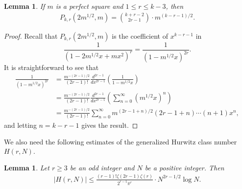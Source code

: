 \documentclass[11pt,letterpaper,reqno]{amsart}
\numberwithin{figure}{section}
\numberwithin{table}{section}
\theoremstyle{definition}
\theoremstyle{plain}
\newtheorem{lemma}[theorem]{Lemma}
\theoremstyle{definition}
\theoremstyle{definition}
\theoremstyle{remark}
\numberwithin{equation}{section}
\theoremstyle{remark}
\begin{document}
\begin{lemma}\label{lem:P_k,rperfectsquare}
    If $m$ is a perfect square and $1\leq r\leq k-3$, then 
    \begin{align}
        P_{k,r}(2m^{1/2},m)=\binom{k+r-2}{2r-1}\cdot m^{(k-r-1)/2}.
    \end{align}
\end{lemma}
\begin{proof}
Recall that $P_{k,r}(2m^{1/2},m)$ is the coefficient of $x^{k-r-1}$ in 
$$\frac{1}{(1-2m^{1/2}x+mx^2)^{r}}=\frac{1}{(1-m^{1/2}x)^{2r}}.$$ 
It is straightforward to see that
\begin{align}
    \frac{1}{(1-m^{1/2}x)^{2r}}&= \frac{m^{-(2r-1)/2}}{(2r-1)!}\frac{d^{2r-1}}{dx^{2r-1}}\left(\frac{1}{1-m^{1/2}x}\right)\\&=
    \frac{m^{-(2r-1)/2}}{(2r-1)!}\frac{d^{2r-1}}{dx^{2r-1}}\left(\sum_{n=0}^{\infty}(m^{1/2}x)^n\right)\\&=\frac{m^{-(2r-1)/2}}{(2r-1)!}\sum_{n=0}^{\infty}m^{(2r-1+n)/2}(2r-1+n)\cdots(n+1)x^n,
\end{align}
and letting $n=k-r-1$ gives the result.
\end{proof}
We also need the following estimates of the generalized Hurwitz class number $H(r,N)$.
\begin{lemma}\label{lem:boundsforclassnumber}
    Let $r\geq3$ be an odd integer and $N$ be a positive integer. Then
    \begin{align}
        |H(r,N)|\leq\frac{(r-1)!\zeta(2r-1)\zeta(r)}{2^{r-1}\pi^r}\cdot N^{2r-1/2}\log N.
    \end{align}
\end{lemma}
\end{document}
